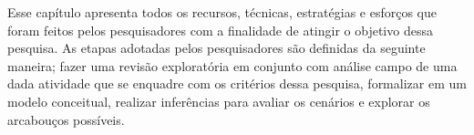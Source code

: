 Esse capítulo apresenta todos os recursos, técnicas, estratégias e esforços que foram feitos pelos pesquisadores com a finalidade de atingir o objetivo dessa pesquisa. As etapas adotadas pelos pesquisadores são definidas da seguinte maneira; fazer uma revisão exploratória em conjunto com análise campo de uma dada atividade que se enquadre com os critérios dessa pesquisa, formalizar em um modelo conceitual, realizar inferências para avaliar os cenários e explorar os arcabouços possíveis.

